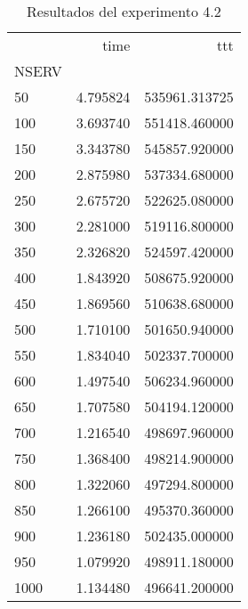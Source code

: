 \begin{table}
\centering
\caption{Resultados del experimento 4.2}
\label{tab:ex4s}
\begin{tabular}{lrr}
\toprule
{} &      time &            ttt \\
NSERV &           &                \\
\midrule
50    &  4.795824 &  535961.313725 \\
100   &  3.693740 &  551418.460000 \\
150   &  3.343780 &  545857.920000 \\
200   &  2.875980 &  537334.680000 \\
250   &  2.675720 &  522625.080000 \\
300   &  2.281000 &  519116.800000 \\
350   &  2.326820 &  524597.420000 \\
400   &  1.843920 &  508675.920000 \\
450   &  1.869560 &  510638.680000 \\
500   &  1.710100 &  501650.940000 \\
550   &  1.834040 &  502337.700000 \\
600   &  1.497540 &  506234.960000 \\
650   &  1.707580 &  504194.120000 \\
700   &  1.216540 &  498697.960000 \\
750   &  1.368400 &  498214.900000 \\
800   &  1.322060 &  497294.800000 \\
850   &  1.266100 &  495370.360000 \\
900   &  1.236180 &  502435.000000 \\
950   &  1.079920 &  498911.180000 \\
1000  &  1.134480 &  496641.200000 \\
\bottomrule
\end{tabular}
\end{table}
